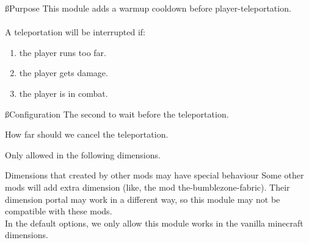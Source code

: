 
\ss{Purpose}
This module adds a warmup cooldown before player-teleportation.
\\\\
A teleportation will be interrupted if:
\begin{enumerate}
    \item the player runs too far.
    \item the player gets damage.
    \item the player is in combat.
\end{enumerate}

\ss{Configuration}
The second to wait before the teleportation.

How far should we cancel the teleportation.

Only allowed in the following dimensions.

\begin{warn}{Dimensions that created by other mods may have special behaviour}
    Some other mods will add extra dimension (like, the mod the-bumblezone-fabric).
    Their dimension portal may work in a different way, so this module may not be compatible with these mods.
    \\
    In the default options, we only allow this module works in the vanilla minecraft dimensions.
\end{warn}
